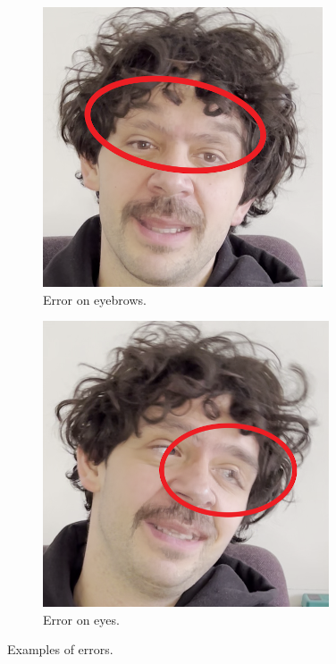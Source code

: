 \documentclass[preprint]{elsarticle}
\begin{document}
\begin{figure}[t]
	\centering
	\begin{subfigure}[b]{0.5\textwidth}
		\centering
		\includegraphics[scale=0.34]{img/project_img/error-eyebrows.png}
		\caption{Error on eyebrows.}\label{fig:error-eyebrows}
	\end{subfigure}%
	\hfill
	\begin{subfigure}[b]{0.5\textwidth}
		\centering
		\includegraphics[scale=0.34]{img/project_img/error-eyes.png}
		\caption{Error on eyes.}\label{fig:error-eyes}
	\end{subfigure}
	\caption{Examples of errors.}\label{fig:errors}
\end{figure}
\end{document}
